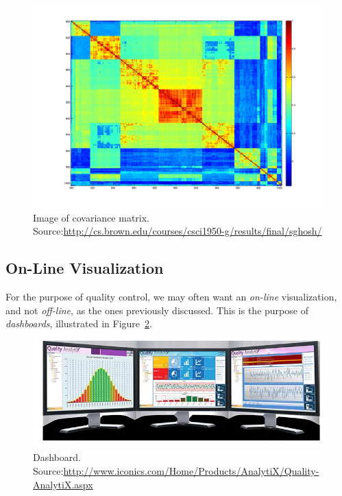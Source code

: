 \documentclass[12pt,a4paper]{report}
\begin{document}
\begin{figure}[h]
\centering
\includegraphics[height=0.3\textheight]{art/covarianceSupervised}
\caption[Covariance Matrix]{Image of covariance matrix. Source:\url{http://cs.brown.edu/courses/csci1950-g/results/final/sghosh/}}
\label{fig:covariance_image}
\end{figure}




\subsection{On-Line Visualization}
For the purpose of quality control, we may often want an \emph{on-line} visualization, and not \emph{off-line}, as the ones previously discussed.
This is the purpose of \emph{dashboards}, illustrated in Figure~\ref{fig:dashboard}.

\begin{figure}[h]
\centering
\includegraphics[height=0.3\textheight, width=0.9\linewidth]{art/dashboard}
\caption[Dashboard]{Dashboard. Source:\url{http://www.iconics.com/Home/Products/AnalytiX/Quality-AnalytiX.aspx}}
\label{fig:dashboard}
\end{figure}
\end{document}
